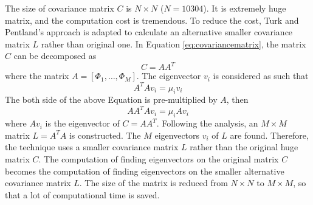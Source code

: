 The size of covariance matrix $C$ is $N\times N$ ($N=10304$). It is extremely huge matrix, and the computation cost is tremendous. To reduce the cost, Turk and Pentland’s approach \cite{Turk1991} is adapted to calculate an alternative smaller covariance matrix $L$ rather than original one. In \mbox{Equation} \ref{eq:covariancematrix}, the matrix $C$ can be decomposed as
\begin{equation}
 C = A A^T
\end{equation}
where the matrix $A=[\Phi_1,\ldots,\Phi_M]$. The eigenvector $v_i$ is considered as such that
\begin{equation}
 A^T A v_i = \mu_i v_i
\end{equation}
The both side of the above \mbox{Equation} is pre-multiplied by $A$, then
\begin{equation}
 A A^T A v_i = \mu_i A v_i
\end{equation}
where $Av_i$ is the eigenvector of $C=AA^T$. Following the analysis, an $M\times M$ matrix $L=A^T A$ is constructed. The $M$ eigenvectors $v_i$ of $L$ are found. Therefore, the technique uses a smaller covariance matrix $L$ rather than the original huge matrix $C$. The computation of finding eigenvectors on the original matrix $C$ becomes the computation of finding eigenvectors on the smaller alternative covariance matrix $L$. The size of the matrix is reduced from $N\times N$ to $M\times M$, so that a lot of computational time is saved.


